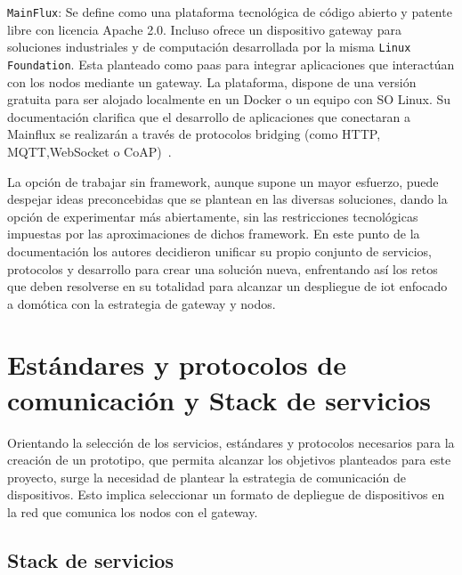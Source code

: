 \vspace{1cm}

\verb|MainFlux|: Se define como una plataforma tecnológica de código abierto y patente libre con licencia Apache 2.0. Incluso ofrece un dispositivo \gls{gateway} para soluciones industriales y de computación desarrollada por la misma \verb|Linux Foundation|. Esta planteado como \gls{paas} para integrar aplicaciones que interactúan con los nodos mediante un \gls{gateway}. La plataforma, dispone de una versión gratuita para ser alojado localmente en un Docker o un equipo con SO Linux. Su documentación clarifica que el desarrollo de aplicaciones que conectaran a Mainflux se realizarán a través de protocolos bridging (como HTTP, MQTT,WebSocket o CoAP)~\cite{mainfluxdoc}.


La opción de trabajar sin \gls{framework}, aunque supone un mayor esfuerzo, puede despejar ideas preconcebidas que se plantean en las diversas soluciones, dando la opción de experimentar más abiertamente, sin las restricciones tecnológicas impuestas por las aproximaciones de dichos \gls{framework}. En este punto de la documentación los autores decidieron unificar su propio conjunto de servicios, protocolos y desarrollo para crear una solución nueva, enfrentando así los retos que deben resolverse en su totalidad para alcanzar un despliegue de \gls{iot} enfocado a domótica con la estrategia de \gls{gateway} y nodos.

\section{Estándares y protocolos de comunicación y Stack de servicios}
\label{ch:Capitulo2.3}

Orientando la selección de los servicios, estándares y protocolos necesarios para la creación de un prototipo, que permita alcanzar los objetivos planteados para este proyecto, surge la necesidad de plantear la estrategia de comunicación de dispositivos. Esto implica seleccionar un formato de depliegue de dispositivos en la red que comunica los nodos con el \gls{gateway}. 

\vspace{1cm}

\subsection{Stack de servicios}
\label{ch:Capitulo2.3.1}

